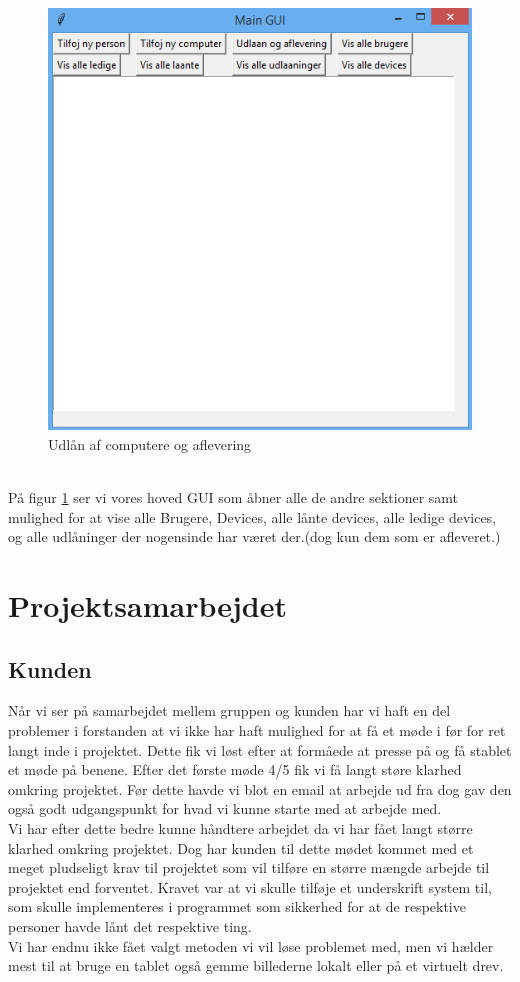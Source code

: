 \documentclass[a4paper]{article}
\begin{document}
\pagebreak
\begin{figure}[h!]
\centering
\includegraphics[width=1\textwidth]{mainGUI.png}
\caption{Udlån af computere og aflevering}
\label{fig:GUI4}
\end{figure}\\
På figur \ref{fig:GUI4} ser vi vores hoved GUI som åbner alle de andre sektioner samt mulighed for at vise alle Brugere, Devices, alle lånte devices, alle ledige devices, og alle udlåninger der nogensinde har været der.(dog kun dem som er afleveret.)
\pagebreak

\section{Projektsamarbejdet}
\subsection{Kunden}
Når vi ser på samarbejdet mellem gruppen og kunden har vi haft en del problemer i forstanden at vi ikke har haft mulighed for at få et møde i før for ret langt inde i projektet. Dette fik vi løst efter at formåede at presse på og få stablet et møde på benene. Efter det første møde 4/5 fik vi få langt støre klarhed omkring projektet. Før dette havde vi blot en email at arbejde ud fra dog gav den også godt udgangspunkt for hvad vi kunne starte med at arbejde med.\\
Vi har efter dette bedre kunne håndtere arbejdet da vi har fået langt større klarhed omkring projektet. Dog har kunden til dette mødet kommet med et meget pludseligt krav til projektet som vil tilføre en større mængde arbejde til projektet end forventet. Kravet var at vi skulle tilføje et underskrift system til, som skulle implementeres i programmet som sikkerhed for at de respektive personer havde lånt det respektive ting.\\
Vi har endnu ikke fået valgt metoden vi vil løse problemet med, men vi hælder mest til at bruge en tablet også gemme billederne lokalt eller på et virtuelt drev.\\
\end{document}
